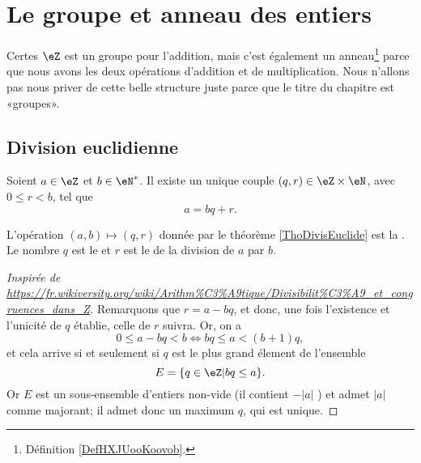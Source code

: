 \section{Le groupe et anneau des entiers}

Certes \( \eZ\) est un groupe pour l'addition, mais c'est également un anneau\footnote{Définition \ref{DefHXJUooKoovob}.} parce que nous avons les deux opérations d'addition et de multiplication. Nous n'allons pas nous priver de cette belle structure juste parce que le titre du chapitre est «groupes».



\subsection{Division euclidienne}

\begin{theorem}     \label{ThoDivisEuclide}
    Soient \( a\in\eZ\) et \( b\in\eN^*\). Il existe un unique couple \( (q,r)\in\eZ\times\eN\), avec \( 0\leq r<b\), tel que
    \begin{equation}
        a=bq+r.
    \end{equation}
\end{theorem}

L'opération \( (a,b)\mapsto(q,r)\) donnée par le théorème \ref{ThoDivisEuclide} est la . Le nombre \( q\) est le  et \( r\) est le  de la division de \( a\) par \( b\).

\begin{proof}[Inspirée de \url{https://fr.wikiversity.org/wiki/Arithm\%C3\%A9tique/Divisibilit\%C3\%A9_et_congruences_dans_Z}]
    Remarquons que \( r = a - bq \), et donc, une fois l'existence et l'unicité de $q$ établie, celle de $r$ suivra. Or, on a
    \begin{equation*}
        0 \leq a - bq < b \iff bq \leq a < (b+1) q,
    \end{equation*}
    et cela arrive si et seulement si $q$ est le plus grand élement de l'ensemble
    \begin{equation*}
        E = \{ q \in \eZ  | bq \leq a \}.
    \end{equation*}
    Or $E$ est un sous-ensemble d'entiers non-vide (il contient \( -|a| \) ) et admet \( |a| \) comme majorant; il admet donc un maximum $q$, qui est unique.
\end{proof}

